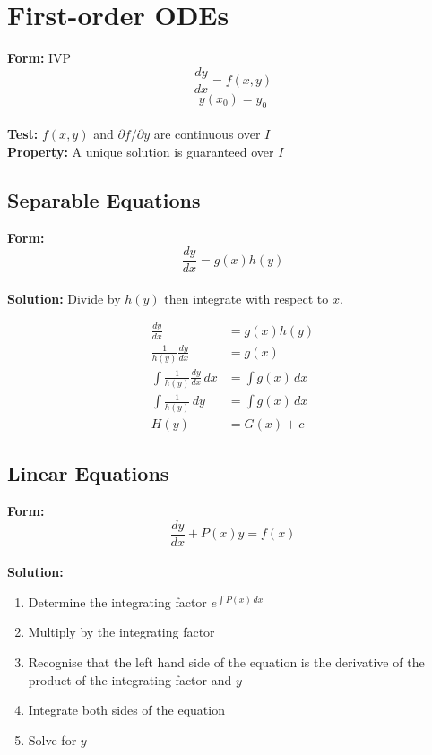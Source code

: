\documentclass{article}
\begin{document}
\section{First-order ODEs}

\textbf{Form:} IVP \[\frac{d y}{d x} = f(x, y)\] \[y(x_0) = y_0\] \\ \textbf{Test:} $f(x, y)$ and $\partial f / \partial y$ are continuous over $I$ \\ \textbf{Property:} A unique solution is guaranteed over $I$

\subsection{Separable Equations}

\textbf{Form:} \[\frac{d y}{d x} = g(x) h(y)\] \\ \textbf{Solution:} Divide by $h(y)$ then integrate with respect to $x$.

\begin{align*}
  \frac{d y}{d x}                          & = g(x) h(y)      \\
  \frac{1}{h(y)} \frac{d y}{d x}           & = g(x)           \\
  \int \frac{1}{h(y)} \frac{d y}{d x} \,dx & = \int g(x) \,dx \\
  \int \frac{1}{h(y)} \,dy                 & = \int g(x) \,dx \\
  H(y)                                     & = G(x) + c
\end{align*}

\subsection{Linear Equations}

\textbf{Form:} \[\frac{d y}{d x} + P(x) y = f(x)\] \\ \textbf{Solution:}

\begin{enumerate}
  \item Determine the integrating factor $e^{\int P(x) \,d x}$

  \item Multiply by the integrating factor

  \item Recognise that the left hand side of the equation is the derivative of the product of the integrating factor and $y$

  \item Integrate both sides of the equation

  \item Solve for $y$
\end{enumerate}
\end{document}
